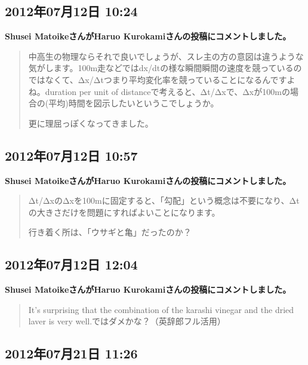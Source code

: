 \subsection*{2012年07月12日 10:24}

\textbf{Shusei MatoikeさんがHaruo Kurokamiさんの投稿にコメントしました。}

\begin{quote}
中高生の物理ならそれで良いでしょうが、スレ主の方の意図は違うような気がします。100m走などではdx/dtの様な瞬間瞬間の速度を競っているのではなくて、Δx/Δtつまり平均変化率を競っていることになるんですよね。duration per unit of distanceで考えると、Δt/Δxで、Δxが100mの場合の(平均)時間を図示したいというこでしょうか。

更に理屈っぽくなってきました。
\end{quote}

\subsection*{2012年07月12日 10:57}

\textbf{Shusei MatoikeさんがHaruo Kurokamiさんの投稿にコメントしました。}

\begin{quote}
Δt/ΔxのΔxを100mに固定すると、「勾配」という概念は不要になり、Δtの大きさだけを問題にすればよいことになります。

行き着く所は、「ウサギと亀」だったのか？
\end{quote}

\subsection*{2012年07月12日 12:04}

\textbf{Shusei MatoikeさんがHaruo Kurokamiさんの投稿にコメントしました。}

\begin{quote}
It's surprising that the combination of the karashi vinegar and the dried laver is very well.ではダメかな？（英辞郎フル活用）
\end{quote}

\subsection*{2012年07月21日 11:26}

